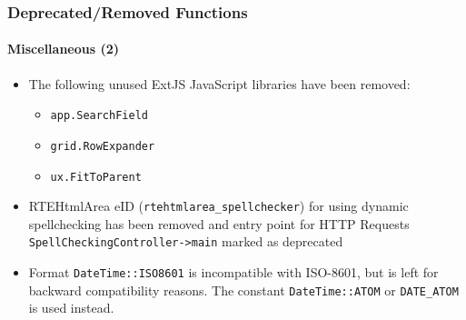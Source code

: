 \begin{frame}[fragile]
	\frametitle{Deprecated/Removed Functions}
	\framesubtitle{Miscellaneous (2)}

	\begin{itemize}

		\item The following unused ExtJS JavaScript libraries have been removed:

			\begin{itemize}
				\item \texttt{app.SearchField}
				\item \texttt{grid.RowExpander}
				\item \texttt{ux.FitToParent}
			\end{itemize}

		\item RTEHtmlArea eID (\texttt{rtehtmlarea\_spellchecker}) for using
			dynamic spellchecking has been removed and entry point for HTTP Requests
			\texttt{SpellCheckingController->main} marked as deprecated

		\item Format \texttt{DateTime::ISO8601} is incompatible with ISO-8601,
			but is left for backward compatibility reasons.
			The constant \texttt{DateTime::ATOM} or \texttt{DATE\_ATOM} is used instead.

	\end{itemize}

\end{frame}


